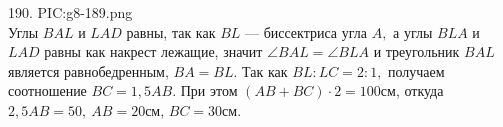 190. {{PIC:g8-189.png}}\\
Углы $BAL$ и $LAD$ равны, так как $BL$ --- биссектриса угла $A,$ а углы $BLA$ и $LAD$ равны как накрест лежащие, значит $\angle BAL=\angle BLA$ и треугольник $BAL$ является равнобедренным, $BA=BL.$ Так как $BL:LC=2:1,$ получаем соотношение $BC=1,5AB.$ При этом $(AB+BC)\cdot2=100$см, откуда $2,5AB=50,\ AB=20$см, $BC=30$см.\\
